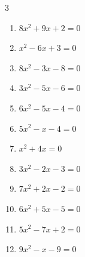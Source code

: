 \begin{multicols}{3}
\begin{enumerate}

  \item $8x^{2}+9x+2=0$


  \item $x^{2}-6x+3=0$


  \item $8x^{2}-3x-8=0$


\columnbreak %

\resetques

  \item $3x^{2}-5x-6=0$


  \item $6x^{2}-5x-4=0$


  \item $5x^{2}-x-4=0$


  \item $x^{2}+4x=0$

        \phantom{$\displaystyle x=0, \; -4$}

  \item $3x^{2}-2x-3=0$


  \item $7x^{2}+2x-2=0$


  \item $6x^{2}+5x-5=0$


\columnbreak %

  \item $5x^{2}-7x+2=0$


  \item $9x^{2}-x-9=0$


\end{enumerate}
\end{multicols}
